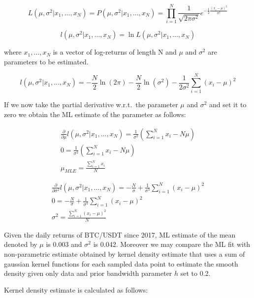 \begin{equation}
L(\mu,\sigma^2|x_1,\ldots,x_N) = P(\mu,\sigma^2|x_1,\ldots,x_N) = \prod_{i=1}^{N} \frac{1}{\sqrt{2\pi \sigma^2}} e^{-\frac{1}{2} \frac{{(x_i-\mu)}^2}{\sigma^2}}
\end{equation}

\begin{equation}
l(\mu,\sigma^2|x_1,\ldots,x_N) = \ln L(\mu,\sigma^2|x_1,\ldots,x_N) 
\end{equation}

where $x_1,\ldots,x_N$ is a vector of log-returns of length N and $\mu$ and $\sigma^2$ are parameters to be estimated. 

\begin{equation}
l(\mu,\sigma^2|x_1,\ldots,x_N) = -\frac{N}{2} \ln(2 \pi) - \frac{N}{2} \ln(\sigma^2) - \frac{1}{2 \sigma^2} \sum_{i=1}^{N} {(x_i - \mu)}^2
\end{equation}

If we now take the partial derivative w.r.t.\ the parameter $\mu$ and $\sigma^2$ and set it to zero we obtain the ML estimate of the parameter as follows:


\begin{gather} 
\frac{\partial}{\partial \mu} l(\mu,\sigma^2|x_1,\ldots,x_N)  = \frac{1}{\sigma^2} (\sum_{i=1}^{N} x_i - N\mu) \\
0 = \frac{1}{\sigma^2} (\sum_{i=1}^{N} x_i - N\mu) \\
\mu_{MLE} = \frac{\sum_{i=1}^{N} x_i}{N}
\end{gather}

\begin{gather} 
\frac{\partial}{\partial \sigma^2} l(\mu,\sigma^2|x_1,\ldots,x_N) = -\frac{N}{\sigma}+ \frac{1}{\sigma^3} \sum_{i=1}^{N} {(x_i - \mu)}^2 \\
0 = -\frac{N}{\sigma}+ \frac{1}{\sigma^3} \sum_{i=1}^{N} {(x_i - \mu)}^2 \\
\sigma^2 = \frac{\sum_{i=1}^{N} {(x_i - \mu)}^2}{N}
\end{gather}


Given the daily returns of BTC/USDT since 2017, ML estimate of the mean denoted by $\mu$ is 0.003 and $\sigma^2$ is 0.042. Moreover we may compare the ML fit with non-parametric estimate obtained by kernel density estimate that uses a sum of gaussian kernel functions for each sampled data point to estimate the smooth density given only data and prior bandwidth parameter $h$ set to 0.2. 

Kernel density estimate is calculated as follows:

